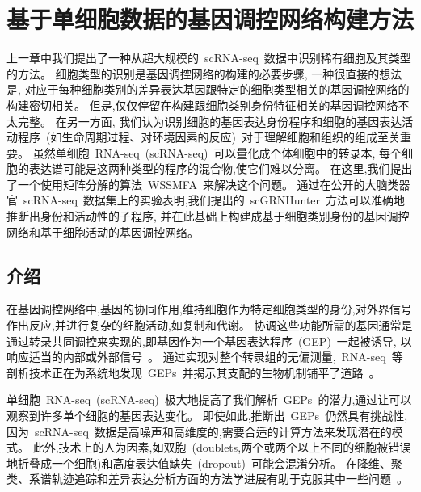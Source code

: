 \section{基于单细胞数据的基因调控网络构建方法}
\label{sec:scgrnhunter}

上一章中我们提出了一种从超大规模的~scRNA-seq~数据中识别稀有细胞及其类型的方法。
细胞类型的识别是基因调控网络的构建的必要步骤, 
一种很直接的想法是, 对应于每种细胞类别的差异表达基因跟特定的细胞类型相关的基因调控网络的构建密切相关。
但是,仅仅停留在构建跟细胞类别身份特征相关的基因调控网络不太完整。
在另一方面,
我们认为识别细胞的基因表达身份程序和细胞的基因表达活动程序~(如生命周期过程、对环境因素的反应)~对于理解细胞和组织的组成至关重要。
虽然单细胞~RNA-seq~(scRNA-seq)~可以量化成个体细胞中的转录本,
每个细胞的表达谱可能是这两种类型的程序的混合物,使它们难以分离。
在这里,我们提出了一个使用矩阵分解的算法~WSSMFA~来解决这个问题。
通过在公开的大脑类器官~scRNA-seq~数据集上的实验表明,我们提出的~scGRNHunter~方法可以准确地推断出身份和活动性的子程序, 
并在此基础上构建成基于细胞类别身份的基因调控网络和基于细胞活动的基因调控网络。


\subsection{介绍}
在基因调控网络中,基因的协同作用,维持细胞作为特定细胞类型的身份,对外界信号作出反应,并进行复杂的细胞活动,如复制和代谢。
协调这些功能所需的基因通常是通过转录共同调控来实现的,即基因作为一个基因表达程序~(GEP)~一起被诱导,
以响应适当的内部或外部信号~\cite{eisen1998cluster,segal2003module}。
通过实现对整个转录组的无偏测量,~RNA-seq~等剖析技术正在为系统地发现~GEPs~并揭示其支配的生物机制铺平了道路~\cite{liberzon2015molecular}。

单细胞~RNA-seq~(scRNA-seq)~极大地提高了我们解析~GEPs~的潜力,通过让可以观察到许多单个细胞的基因表达变化。
即使如此,推断出~GEPs~仍然具有挑战性,
因为~scRNA-seq~数据是高噪声和高维度的,需要合适的计算方法来发现潜在的模式。
此外,技术上的人为因素,如双胞~(doublets,两个或两个以上不同的细胞被错误地折叠成一个细胞)和高度表达值缺失~(dropout)~可能会混淆分析。
在降维、聚类、系谱轨迹追踪和差异表达分析方面的方法学进展有助于克服其中一些问题~\cite{amir2013visne,kharchenko2014bayesian,satija2015spatial,trapnell2014dynamics}。

